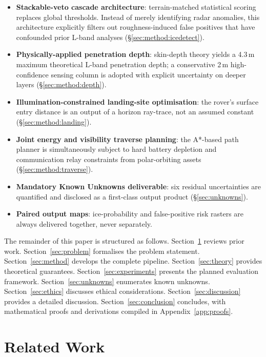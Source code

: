 \documentclass[10pt,conference]{IEEEtran}
\begin{document}
\begin{itemize}
  \item \textbf{Stackable-veto cascade architecture}: terrain-matched statistical scoring replaces global thresholds. Instead of merely identifying radar anomalies, this architecture explicitly filters out roughness-induced false positives that have confounded prior L-band analyses (\S\ref{sec:method:icedetect}).
  \item \textbf{Physically-applied penetration depth}: skin-depth theory
    yields a 4.3\,m maximum theoretical L-band penetration depth; a conservative 2\,m high-confidence sensing column is
    adopted with explicit uncertainty on deeper layers
    (\S\ref{sec:method:depth}).
  \item \textbf{Illumination-constrained landing-site optimisation}: the
    rover's surface entry distance is an output of a horizon ray-trace,
    not an assumed constant (\S\ref{sec:method:landing}).
  \item \textbf{Joint energy and visibility traverse planning}: the
    A*-based path planner is simultaneously subject to hard battery depletion and communication relay constraints from polar-orbiting assets (\S\ref{sec:method:traverse}).
  \item \textbf{Mandatory Known Unknowns deliverable}: six residual
    uncertainties are quantified and disclosed as a first-class
    output product (\S\ref{sec:unknowns}).
  \item \textbf{Paired output maps}: ice-probability and false-positive
    risk rasters are always delivered together, never separately.
\end{itemize}

The remainder of this paper is structured as follows.
Section~\ref{sec:related} reviews prior work.
Section~\ref{sec:problem} formalises the problem statement.
Section~\ref{sec:method} develops the complete pipeline.
Section~\ref{sec:theory} provides theoretical guarantees.
Section~\ref{sec:experiments} presents the planned evaluation framework.
Section~\ref{sec:unknowns} enumerates known unknowns.
Section~\ref{sec:ethics} discusses ethical considerations.
Section~\ref{sec:discussion} provides a detailed discussion.
Section~\ref{sec:conclusion} concludes, with mathematical proofs and derivations compiled in Appendix~\ref{app:proofs}.

\section{Related Work}
\label{sec:related}
\end{document}
